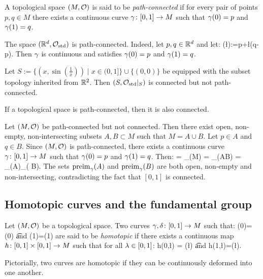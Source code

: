 \bd
A topological space $(M,\mathcal{O})$ is said to be \emph{path-connected} if for every pair of points $p,q\in M$ there exists a continuous curve $\gamma\colon[0,1]\to M$ such that $\gamma(0)=p$ and $\gamma(1)=q$.
\ed

\be
The space $(\mathbb{R}^d,\mathcal{O}_\mathrm{std})$ is path-connected. Indeed, let $p,q\in\mathbb{R}^d$ and let:
\bse
\g(\l):=p+\l(q-p).
\ese
Then $\gamma$ is continuous and satisfies $\gamma(0)=p$ and $\gamma(1)=q$.
\ee

\be
Let $S:=\{(x,\sin(\tfrac{1}{x}))\mid x\in (0,1]\}\cup \{(0,0)\}$ be equipped with the subset topology inherited from $\mathbb{R}^2$. Then $(S,\mathcal{O}_\mathrm{std}|_S)$ is connected but not path-connected.
\ee

\bt
If a topological space is path-connected, then it is also connected.
\et

\bq
Let $(M,\mathcal{O})$ be path-connected but not connected. Then there exist open, non-empty, non-intersecting subsets $A,B\subset M$ such that $M=A\cup B$. Let $p \in A$ and $q \in B$. Since $(M,\mathcal{O})$ is path-connected, there exists a continuous curve $\gamma\colon[0,1]\to M$ such that $\gamma(0)=p$ and $\gamma(1)=q$. Then:
\bse
[0,1] = _\g(M) =  _\g(A\cup B) =  _\g(A)\cup  {}_\g( B).
\ese
The sets $\mathrm{preim}_\gamma(A)$ and $ \mathrm{preim}_\gamma( B)$ are both open, non-empty and non-intersecting, contradicting the fact that $[0,1]$ is connected.
\eq

\subsection{Homotopic curves and the fundamental group}

\bd
Let $(M,\mathcal{O})$ be a topological space. Two curves $\gamma,\delta\colon[0,1]\to M$ such that:
\bse
\g(0)=\delta(0) \quad \t{and} \quad \g(1)=\delta(1)
\ese
are said to be \emph{homotopic} if there exists a continuous map $h \colon [0,1]\times[0,1]\to M$ such that for all $\lambda \in [0,1]$:
\bse
h(0,\l) = \g(\l) \quad \t{and} \quad h(1,\l)=\delta(\l).
\ese
\ed

Pictorially, two curves are homotopic if they can be continuously deformed into one another.

